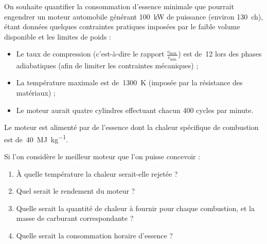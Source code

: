 	On souhaite quantifier la consommation d’essence minimale que pourrait engendrer un moteur automobile générant \SI{100}{\kilo\watt} de puissance (environ \SI{130}{ch}), étant données quelques contraintes pratiques imposées par le faible volume disponible et les limites de poids :
		
	\begin{itemize}
		\item Le taux de compression (c’est-à-dire le rapport $\frac{v_\text{max.}}{v_\text{min.}}$) est de~\num{12} lors des phases adiabatiques (afin de limiter les contraintes mécaniques) ;
		\item La température maximale est de~\SI{1300}{\kelvin} (imposée par la résistance des matériaux) ;
		\item Le moteur aurait quatre cylindres effectuant chacun \num{400} cycles par minute.
	\end{itemize}
	
	Le moteur est alimenté par de l’essence dont la chaleur spécifique de combustion est de~\SI{40}{\mega\joule\per\kilogram}.
	
	Si l’on considère le meilleur moteur que l’on puisse concevoir :
	
	\begin{enumerate}
		\item À quelle température la chaleur serait-elle rejetée ?
		\item Quel serait le rendement du moteur ?
		\item Quelle serait la quantité de chaleur à fournir pour chaque combustion, et la masse de carburant correspondante ?
		\item Quelle serait la consommation horaire d’essence ?
	\end{enumerate}

\exercisesolutionpage
\titreresultats
	\linktosolutionsblurb

